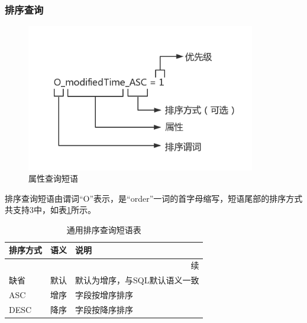 \documentclass[titlepage,UTF8,linespread=1.5]{ctexart}
\begin{document}
\subsubsection{排序查询}
\begin{figure}[H]
    \centering
    \includegraphics[width=100mm]{query_order.png}
    \caption{属性查询短语}
    \label{fig:query_order}
\end{figure}
排序查询短语由谓词“O”表示，是“order”一词的首字母缩写，短语尾部的排序方式共支持3中，如表\ref{tab:query_order}所示。
\begin{longtable}{|p{10em}|p{6em}|p{15em}|}
	\caption{通用排序查询短语表}\label{tab:query_order} \\\hline
	排序方式 & 语义 & 说明                              \\\hline
	\endfirsthead
	\multicolumn{3}{r}{{续\tablename\thetable{}}}       \\\hline
	\endhead
	缺省     & 默认 & 默认为增序，与SQL默认语义一致     \\\hline
	ASC      & 增序 & 字段按增序排序                    \\\hline
	DESC     & 降序 & 字段按降序排序                    \\\hline
\end{longtable}\par
\end{document}
